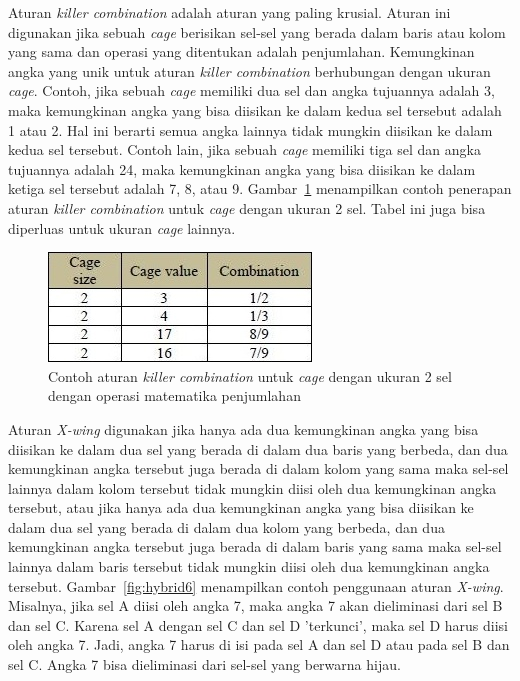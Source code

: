 Aturan \textit{killer combination} adalah aturan yang paling krusial. Aturan ini digunakan jika sebuah \textit{cage} berisikan sel-sel yang berada dalam baris atau kolom yang sama dan operasi yang ditentukan adalah penjumlahan. Kemungkinan angka yang unik untuk aturan \textit{killer combination} berhubungan dengan ukuran \textit{cage}. Contoh, jika sebuah \textit{cage} memiliki dua sel dan angka tujuannya adalah 3, maka kemungkinan angka yang bisa diisikan ke dalam kedua sel tersebut adalah 1 atau 2. Hal ini berarti semua angka lainnya tidak mungkin diisikan ke dalam kedua sel tersebut. Contoh lain, jika sebuah \textit{cage} memiliki tiga sel dan angka tujuannya adalah 24, maka kemungkinan angka yang bisa diisikan ke dalam ketiga sel tersebut adalah 7, 8, atau 9. Gambar~\ref{fig:hybrid5} menampilkan contoh penerapan aturan \textit{killer combination} untuk \textit{cage} dengan ukuran 2 sel. Tabel ini juga bisa diperluas untuk ukuran \textit{cage} lainnya.

\begin{figure}
\centering
\captionsetup{justification=centering}
\includegraphics[scale=1]{Gambar/HybridGenetic5}
\caption[Contoh aturan \textit{killer combination} untuk \textit{cage} dengan ukuran 2 sel dengan operasi matematika penjumlahan~\cite{johanna:12:hybrid}]{Contoh aturan \textit{killer combination} untuk \textit{cage} dengan ukuran 2 sel dengan operasi matematika penjumlahan~\cite{johanna:12:hybrid}}
\label{fig:hybrid5}
\end{figure}

Aturan \textit{X-wing} digunakan jika hanya ada dua kemungkinan angka yang bisa diisikan ke dalam dua sel yang berada di dalam dua baris yang berbeda, dan dua kemungkinan angka tersebut juga berada di dalam kolom yang sama maka sel-sel lainnya dalam kolom tersebut tidak mungkin diisi oleh dua kemungkinan angka tersebut, atau jika hanya ada dua kemungkinan angka yang bisa diisikan ke dalam dua sel yang berada di dalam dua kolom yang berbeda, dan dua kemungkinan angka tersebut juga berada di dalam baris yang sama maka sel-sel lainnya dalam baris tersebut tidak mungkin diisi oleh dua kemungkinan angka tersebut. Gambar~\ref{fig:hybrid6} menampilkan contoh penggunaan aturan \textit{X-wing}. Misalnya, jika sel A diisi oleh angka 7, maka angka 7 akan dieliminasi dari sel B dan sel C. Karena sel A dengan sel C dan sel D 'terkunci', maka sel D harus diisi oleh angka 7. Jadi, angka 7 harus di isi pada sel A dan sel D atau pada sel B dan sel C. Angka 7 bisa dieliminasi dari sel-sel yang berwarna hijau.


